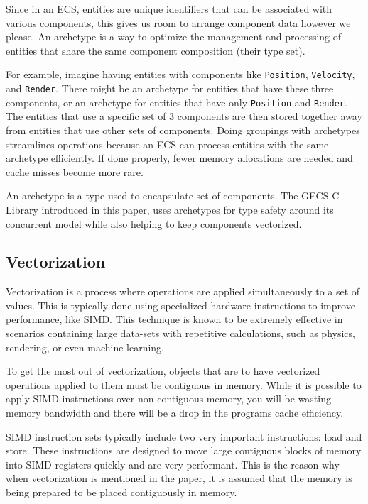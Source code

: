 Since in an ECS, entities are unique identifiers that can be associated with various components, this gives us room to arrange component data however we please. An archetype is a way to optimize the management and processing of entities that share the same component composition (their type set). 

For example, imagine having entities with components like \texttt{Position}, \texttt{Velocity}, and \texttt{Render}. There might be an archetype for entities that have these three components, or an archetype for entities that have only \texttt{Position} and \texttt{Render}. The entities that use a specific set of 3 components are then stored together away from entities that use other sets of components. Doing groupings with archetypes streamlines operations because an ECS can process entities with the same archetype efficiently. If done properly, fewer memory allocations are needed and cache misses become more rare. 

An archetype is a type used to encapsulate set of components. The GECS C Library introduced in this paper, uses archetypes for type safety around its concurrent model while also helping to keep components vectorized.

\subsection{Vectorization}
Vectorization is a process where operations are applied simultaneously to a set of values. This is typically done using specialized hardware instructions to improve performance, like SIMD. This technique is known to be extremely effective in scenarios containing large data-sets with repetitive calculations, such as physics, rendering, or even machine learning.  \cite{RomeoPHD}

To get the most out of vectorization, objects that are to have vectorized operations applied to them must be contiguous in memory. While it is possible to apply SIMD instructions over non-contiguous memory, you will be wasting memory bandwidth and there will be a drop in the programs cache efficiency. 

SIMD instruction sets typically include two very important instructions: load and store. These instructions are designed to move large contiguous blocks of memory into SIMD registers quickly and are very performant. This is the reason why when vectorization is mentioned in the paper, it is assumed that the memory is being prepared to be placed contiguously in memory. 

